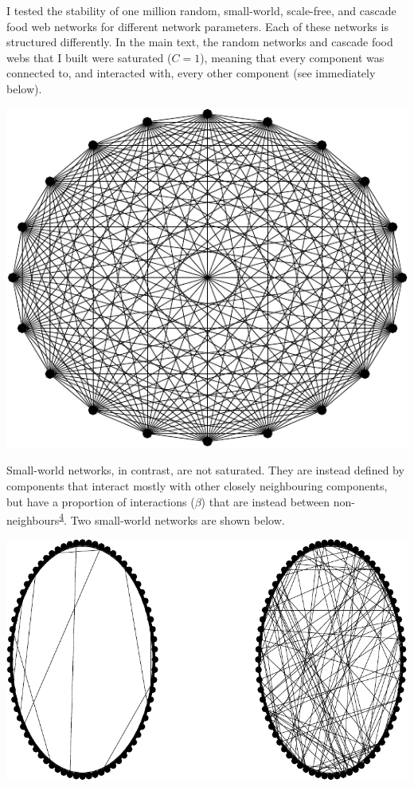 \documentclass[]{article}
\begin{document}
I tested the stability of one million random, small-world, scale-free,
and cascade food web networks for different network parameters. Each of
these networks is structured differently. In the main text, the random
networks and cascade food webs that I built were saturated (\(C = 1\)),
meaning that every component was connected to, and interacted with,
every other component (see immediately below).

\vspace{2mm}

\begin{center}\includegraphics{unnamed-chunk-23-1} \end{center}

\vspace{2mm}

Small-world networks, in contrast, are not saturated. They are instead
defined by components that interact mostly with other closely
neighbouring components, but have a proportion of interactions
(\(\beta\)) that are instead between
non-neighbours\textsuperscript{\protect\hyperlink{ref-Watts1998}{4}}.
Two small-world networks are shown below.

\vspace{2mm}

\begin{center}\includegraphics{unnamed-chunk-24-1} \end{center}
\end{document}
